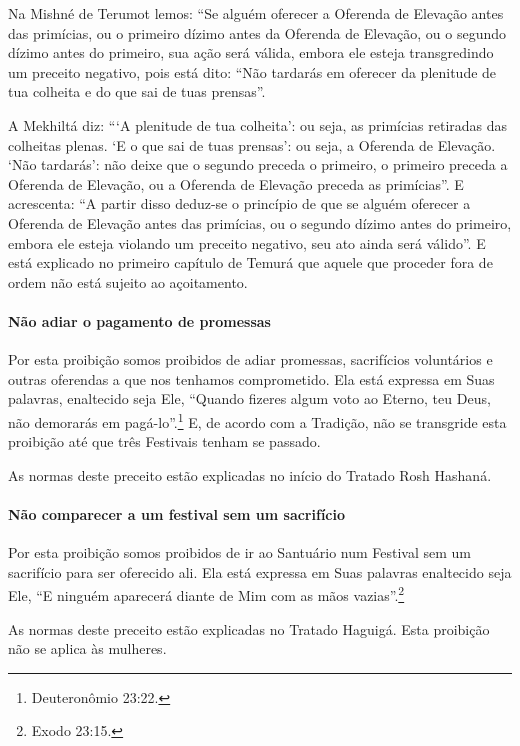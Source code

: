 Na Mishné de Terumot lemos: ``Se alguém oferecer a Oferenda de Elevação
antes das primícias, ou o primeiro dízimo antes da Oferenda de
Elevação, ou o segundo dízimo antes do primeiro, sua ação será válida,
embora ele esteja transgredindo um preceito negativo, pois está dito:
``Não tardarás em oferecer da plenitude de tua colheita e do que sai de
tuas prensas''.

A Mekhiltá diz: ```A plenitude de tua colheita': ou seja, as primícias
retiradas das colheitas plenas. `E o que sai de tuas prensas': ou seja,
a Oferenda de Elevação. `Não tardarás': não deixe que o segundo preceda
o primeiro, o primeiro preceda a Oferenda de Elevação, ou a Oferenda de
Elevação preceda as primícias''. E acrescenta: ``A partir disso deduz-se
o princípio de que se alguém oferecer a Oferenda de Elevação antes das
primícias, ou o segundo dízimo antes do primeiro, embora ele esteja
violando um preceito negativo, seu ato ainda será válido''. E está
explicado no primeiro capítulo de Temurá que aquele que proceder fora de
ordem não está sujeito ao açoitamento.

\paragraph{Não adiar o pagamento de promessas}

Por esta proibição somos proibidos de adiar promessas, sacrifícios
voluntários e outras oferendas a que nos tenhamos comprometido. Ela está
expressa em Suas palavras, enaltecido seja Ele, ``Quando fizeres algum
voto ao Eterno, teu Deus, não demorarás em pagá-lo''.\footnote{Deuteronômio 23:22.} E, de acordo com a Tradição, não se transgride
esta proibição até que três Festivais tenham se passado.

As normas deste preceito estão explicadas no início do Tratado Rosh Hashaná.

\paragraph{Não comparecer a um festival sem um sacrifício}

Por esta proibição somos proibidos de ir ao Santuário num Festival sem
um sacrifício para ser oferecido ali. Ela está expressa em Suas palavras
enaltecido seja Ele, ``E ninguém aparecerá diante de Mim com as mãos
vazias''.\footnote{Exodo 23:15.}

As normas deste preceito estão explicadas no Tratado Haguigá. Esta
proibição não se aplica às mulheres.

